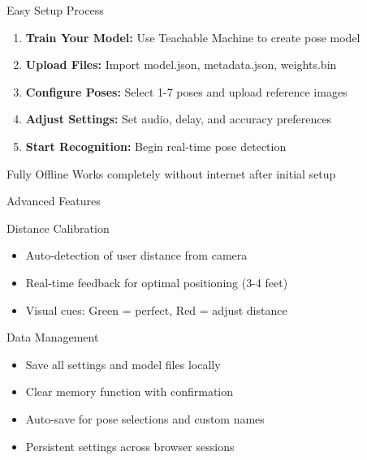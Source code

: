 \documentclass[11pt]{beamer}
\begin{document}
\begin{frame}{Easy Setup Process}
    \begin{enumerate}
        \item \textbf{Train Your Model:} Use Teachable Machine to create pose model
        \item \textbf{Upload Files:} Import model.json, metadata.json, weights.bin
        \item \textbf{Configure Poses:} Select 1-7 poses and upload reference images
        \item \textbf{Adjust Settings:} Set audio, delay, and accuracy preferences
        \item \textbf{Start Recognition:} Begin real-time pose detection
    \end{enumerate}
    \vspace{0.5cm}
    \begin{alertblock}{Fully Offline}
        Works completely without internet after initial setup
    \end{alertblock}
\end{frame}

\begin{frame}{Advanced Features}
    \begin{block}{Distance Calibration}
        \begin{itemize}
            \item Auto-detection of user distance from camera
            \item Real-time feedback for optimal positioning (3-4 feet)
            \item Visual cues: Green = perfect, Red = adjust distance
        \end{itemize}
    \end{block}
    \begin{block}{Data Management}
        \begin{itemize}
            \item Save all settings and model files locally
            \item Clear memory function with confirmation
            \item Auto-save for pose selections and custom names
            \item Persistent settings across browser sessions
        \end{itemize}
    \end{block}
\end{frame}
\end{document}
